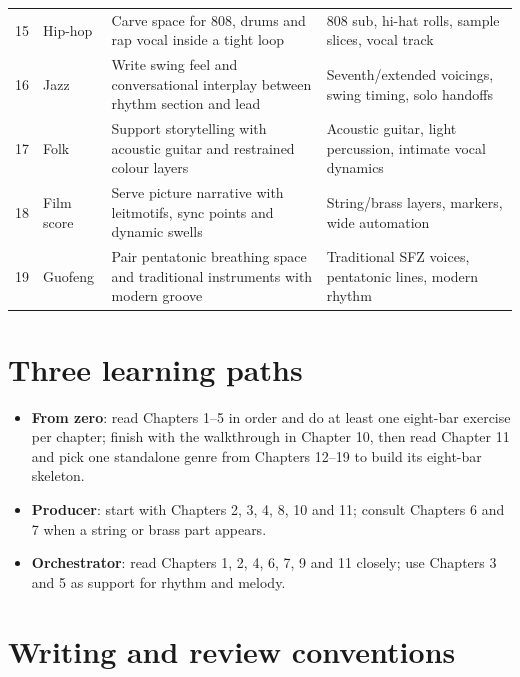 \begin{longtable}{p{}p{}p{}p{}}
15 & Hip-hop & Carve space for 808, drums and rap vocal inside a tight loop & 808 sub, hi-hat rolls, sample slices, vocal track \\
16 & Jazz & Write swing feel and conversational interplay between rhythm section and lead & Seventh/extended voicings, swing timing, solo handoffs \\
17 & Folk & Support storytelling with acoustic guitar and restrained colour layers & Acoustic guitar, light percussion, intimate vocal dynamics \\
18 & Film score & Serve picture narrative with leitmotifs, sync points and dynamic swells & String/brass layers, markers, wide automation \\
19 & Guofeng & Pair pentatonic breathing space and traditional instruments with modern groove & Traditional SFZ voices, pentatonic lines, modern rhythm \\
\bottomrule
\end{longtable}

\section*{Three learning paths}

\begin{itemize}
\item \textbf{From zero}: read Chapters 1--5 in order and do at least one eight-bar exercise per chapter; finish with the walkthrough in Chapter 10, then read Chapter 11 and pick one standalone genre from Chapters 12--19 to build its eight-bar skeleton.
\item \textbf{Producer}: start with Chapters 2, 3, 4, 8, 10 and 11; consult Chapters 6 and 7 when a string or brass part appears.
\item \textbf{Orchestrator}: read Chapters 1, 2, 4, 6, 7, 9 and 11 closely; use Chapters 3 and 5 as support for rhythm and melody.
\end{itemize}

\section*{Writing and review conventions}

